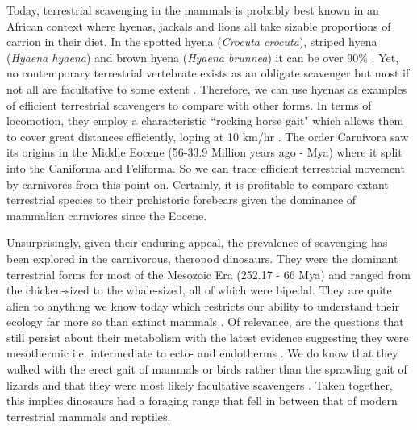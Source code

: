 \documentclass[a4paper,12pt]{article}
\begin{document}
Today, terrestrial scavenging in the mammals is probably best known in an African context where hyenas, jackals and lions all take sizable proportions of carrion in their diet.
In the spotted hyena (\textit{Crocuta crocuta}), striped hyena (\textit{Hyaena hyaena}) and brown hyena (\textit{Hyaena brunnea}) it can be over 90\% \citep{jones2015african}.
Yet, no contemporary terrestrial vertebrate exists as an obligate scavenger but most if not all are facultative to some extent \citep{beasley2015vertebrates}.
Therefore, we can use hyenas as examples of efficient terrestrial scavengers to compare with other forms. 
In terms of locomotion, they employ a characteristic ``rocking horse gait"  which allows them to cover great distances efficiently, loping at 10 km/hr \citep{mills1989comparative,jones2015african}. 
The order Carnivora saw its origins in the Middle Eocene (56-33.9 Million years ago - Mya) where it split into the Caniforma and Feliforma. %
So we can trace efficient terrestrial movement by carnivores from this point on.
Certainly, it is profitable to compare extant terrestrial species to their prehistoric forebears given the dominance of mammalian carnviores since the Eocene.

Unsurprisingly, given their enduring appeal, the prevalence of scavenging has been explored in the carnivorous, theropod dinosaurs.
They were the dominant terrestrial forms for most of the Mesozoic Era (252.17 - 66 Mya) and ranged from the chicken-sized to the whale-sized, all of which were bipedal.
They are quite alien to anything we know today which restricts our ability to understand their ecology far more so than extinct mammals \citep{weishampel2004dinosauria}.
Of relevance, are the questions that still persist about their metabolism with the latest evidence suggesting they were mesothermic i.e. intermediate to ecto- and endotherms \citep{grady2014evidence}. 
We do know that they walked with the erect gait of mammals or birds rather than the sprawling gait of lizards and that they were most likely facultative scavengers \citep{weishampel2004dinosauria,depalma2013physical}. %
Taken together, this implies dinosaurs had a foraging range that fell in between that of modern terrestrial mammals and reptiles. 
\end{document}
